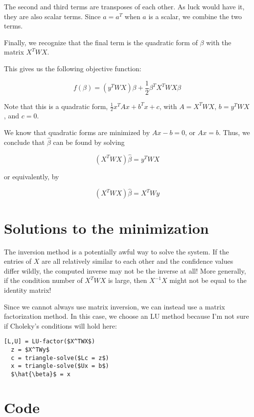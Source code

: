 \documentclass{article}
\begin{document}
The second and third terms are transposes of each other. As luck would have it,
they are also scalar terms. Since $a = a^T$ when $a$ is a scalar, we combine the
two terms.

Finally, we recognize that the final term is the quadratic form of $\beta$ with
the matrix $X^TWX$.

This gives us the following objective function:

\[
 f(\beta) = (y^T W X) \beta + \frac{1}{2} \beta^T X^T W X \beta 
\]

Note that this is a quadratic form, $\frac{1}{2}x^TAx + b^Tx + c$, with $A =
X^TWX$, $b=y^TWX$, and $c=0$.

We know that quadratic forms are minimized by $Ax - b = 0$, or $Ax = b$. Thus,
we conclude that $\hat{\beta}$ can be found by solving

\[
  (X^TWX)\hat{\beta} = y^TWX
\]

or equivalently, by

\[
  (X^TWX)\hat{\beta} = X^TWy
\]

\section{Solutions to the minimization}

The inversion method is a potentially awful way to solve the system. If the
entries of $X$ are all relatively similar to each other and the confidence
values differ wildly, the computed inverse may not be the inverse at all! More
generally, if the condition number of $X^TWX$ is large, then $X^{-1}X$ might not
be equal to the identity matrix!


Since we cannot always use matrix inversion, we can instead use a matrix
factorization method. In this case, we choose an LU method because I'm not sure
if Choleky's conditions will hold here:

\begin{lstlisting}[mathescape = true]
  [L,U] = LU-factor($X^TWX$)
  z = $X^TWy$
  c = triangle-solve($Lc = z$)
  x = triangle-solve($Ux = b$)
  $\hat{\beta}$ = x
\end{lstlisting}

\section{Code}
\end{document}
